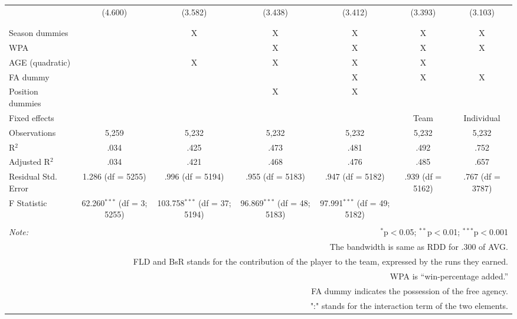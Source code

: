 \begin{table}[H]
\begin{tabular}{@{\extracolsep{-15pt}}lcccccc}
  & (4.600) & (3.582) & (3.438) & (3.412) & (3.393) & (3.103) \\
  & & & & & & \\
\hline \\[-1.8ex]
Season dummies &  & X & X & X & X & X \\
WPA &  &  & X & X & X & X \\
AGE (quadratic) &  & X & X & X & X &  \\
FA dummy &  &  &  & X & X & X \\
Position dummies &  &  & X & X &  &  \\
Fixed effects &  &  &  &  & Team & Individual \\
Observations & 5,259 & 5,232 & 5,232 & 5,232 & 5,232 & 5,232 \\
R$^{2}$ & .034 & .425 & .473 & .481 & .492 & .752 \\
Adjusted R$^{2}$ & .034 & .421 & .468 & .476 & .485 & .657 \\
Residual Std. Error & 1.286 (df = 5255) & .996 (df = 5194) & .955 (df = 5183) & .947 (df = 5182) & .939 (df = 5162) & .767 (df = 3787) \\
F Statistic & 62.260$^{***}$ (df = 3; 5255) & 103.758$^{***}$ (df = 37; 5194) & 96.869$^{***}$ (df = 48; 5183) & 97.991$^{***}$ (df = 49; 5182) &  &  \\
\hline
\hline \\[-1.8ex]
\textit{Note:}  & \multicolumn{6}{r}{$^{*}$p$<$0.05; $^{**}$p$<$0.01; $^{***}$p$<$0.001} \\
& \multicolumn{6}{r}{The bandwidth is same as RDD for .300 of AVG.} \\
& \multicolumn{6}{r}{FLD and BsR stands for the contribution of the player to the team, expressed by the runs they earned.} \\
& \multicolumn{6}{r}{WPA is ``win-percentage added.''} \\
& \multicolumn{6}{r}{FA dummy indicates the possession of the free agency.}\\
& \multicolumn{6}{r}{":" stands for the interaction term of the two elements.} \\
\end{tabular}
\end{table}
